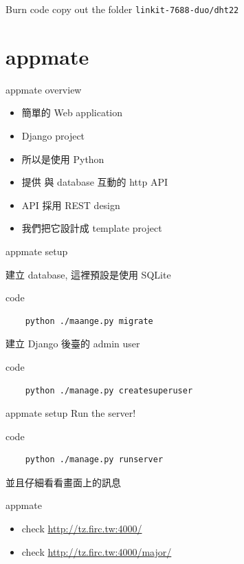 \documentclass{beamer}
\begin{document}
\begin{frame}[fragile]{Burn code}
  \Huge
  copy out the folder \verb|linkit-7688-duo/dht22|
\end{frame}


\section{appmate}

\begin{frame}{appmate overview}
  \Large

  \begin{itemize}
    \item 簡單的 Web application

    \item Django project

    \item 所以是使用 Python

    \item 提供 與 database 互動的 http API

    \item API 採用 REST design

    \item 我們把它設計成 template project
  \end{itemize}
\end{frame}

\begin{frame}[fragile]{appmate setup}

  建立 database, 這裡預設是使用 SQLite
  \begin{block}{code}
  \begin{verbatim}
    python ./maange.py migrate
  \end{verbatim}
  \end{block}

  建立 Django 後臺的 admin user
  \begin{block}{code}
  \begin{verbatim}
    python ./manage.py createsuperuser
  \end{verbatim}
  \end{block}
\end{frame}

\begin{frame}[fragile]{appmate setup}
  Run the server!
  \begin{block}{code}
  \begin{verbatim}
    python ./manage.py runserver
  \end{verbatim}
  \end{block}

  並且仔細看看畫面上的訊息
\end{frame}

\begin{frame}{appmate}
  \begin{itemize}
    \item check \url{http://tz.firc.tw:4000/}

    \item check \url{http://tz.firc.tw:4000/major/}
  \end{itemize}
\end{frame}
\end{document}
